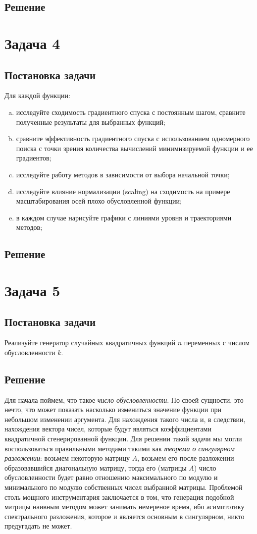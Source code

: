 \documentclass[12pt, a4paper, oneside]{article}
\begin{document}
	\subsection*{Решение}
	\section*{Задача 4}
	\subsection*{Постановка задачи}
	Для каждой функции:
	\begin{enumerate}[(a)]
		\item исследуйте сходимость градиентного спуска с постоянным шагом, сравните полученные результаты для выбранных функций;
		\item сравните эффективность градиентного спуска с использованием одномерного поиска с точки зрения количества вычислений минимизируемой функции и ее градиентов;
		\item исследуйте работу методов в зависимости от выбора начальной точки;
		\item исследуйте влияние нормализации (scaling) на сходимость на примере масштабирования осей плохо обусловленной функции;
		\item в каждом случае нарисуйте графики с линиями уровня и траекториями методов;
	\end{enumerate}
	\subsection*{Решение}
	\section*{Задача 5}
	\subsection*{Постановка задачи}
	Реализуйте генератор случайных квадратичных функций $n$ переменных с числом обусловленности $k$.
	\subsection*{Решение}
	Для начала поймем, что такое \textit{число обусловленности}. По своей сущности, это нечто, что может показать насколько измениться значение функции при небольшом изменении аргумента. Для нахождения такого числа и, в следствии, нахождения вектора чисел, которые будут являться коэффициентами квадратичной сгенерированной функции. Для решении такой задачи мы могли воспользоваться правильными методами такими как \textit{теорема о сингулярном разложении}: возьмем некоторую матрицу $A$, возьмем его после разложении образовавшийся диагональную матрицу, тогда его (матрицы $A$) число обусловленности будет равно отношению максимального по модулю и минимального по модулю собственных чисел выбранной матрицы. Проблемой столь мощного инструментария заключается в том, что генерация подобной матрицы наивным методом может занимать немереное время, ибо асимптотику спектрального разложения, которое и является основным в сингулярном, никто предугадать не может.
\end{document}
